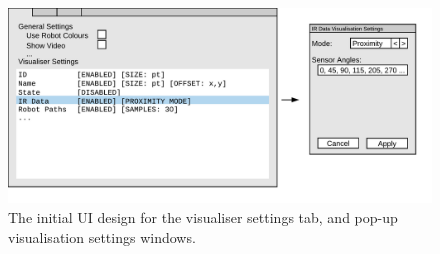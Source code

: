 \begin{figure}
	\centering
	\includegraphics[scale=1]{Figures/VisualiserSettingsTabDesign.png}
	\decoRule
	\caption[Visualiser Settings Tab Design]{The initial UI design for the visualiser settings tab, and pop-up visualisation settings windows.}
	\label{fig:VisualiserSettingsTabDesign}
\end{figure}

